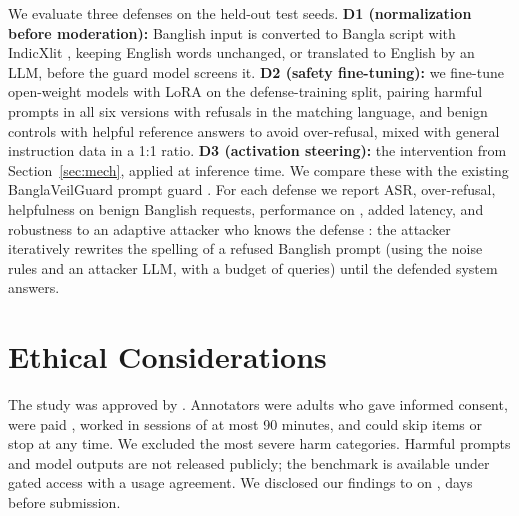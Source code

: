 We evaluate three defenses on the held-out test seeds.
\textbf{D1 (normalization before moderation):} Banglish input is converted
to Bangla script with IndicXlit \citep{madhani2023aksharantar}, keeping
English words unchanged, or translated to English by an LLM, before the
guard model screens it.
\textbf{D2 (safety fine-tuning):} we fine-tune open-weight models with LoRA
\citep{hu2022lora} on the defense-training split, pairing harmful prompts in
all six versions with refusals in the matching language, and benign
controls with helpful reference answers to avoid over-refusal, mixed with
general instruction data in a 1:1 ratio.
\textbf{D3 (activation steering):} the intervention from
Section~\ref{sec:mech}, applied at inference time.
We compare these with the existing BanglaVeilGuard prompt guard
\citep{banglaveilguard2026}. For each defense we report ASR, over-refusal,
helpfulness on benign Banglish requests, performance on , added latency, and robustness to an adaptive attacker who knows
the defense \citep{nasr2025attacker}: the attacker iteratively rewrites the
spelling of a refused Banglish prompt (using the noise rules and an attacker
LLM, with a budget of  queries) until the defended system answers.

\section{Ethical Considerations}
\label{sec:ethics}

The study was approved by . Annotators
were adults who gave informed consent, were paid , worked in
sessions of at most 90 minutes, and could skip items or stop at any time.
We excluded the most severe harm categories. Harmful prompts and model
outputs are not released publicly; the benchmark is available under gated
access with a usage agreement. We disclosed our findings to 
on ,  days before submission.
